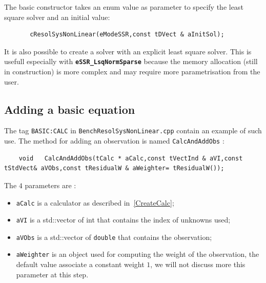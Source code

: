 The basic constructor takes an enum value as parameter to specify
the least square solver and an initial value:

\begin{lstlisting}
       cResolSysNonLinear(eModeSSR,const tDVect & aInitSol);
\end{lstlisting}


It is also possible to create a solver with an explicit least square solver.
This is usefull especially with {\bf \tt eSSR\_LsqNormSparse} because the memory
allocation (still in construction) is more complex and may require more parametrisation
from the user.  \UNCLEAR




\subsection{Adding a basic equation}

\label{AddBasicEq}

The tag  {\tt  BASIC:CALC} in {\tt BenchResolSysNonLinear.cpp} contain an example of such use.
The method for adding an observation is named {\tt CalcAndAddObs} :

\begin{lstlisting}
    void   CalcAndAddObs(tCalc * aCalc,const tVectInd & aVI,const tStdVect& aVObs,const tResidualW & aWeighter= tResidualW());
\end{lstlisting}

The $4$ parameters are :

\begin{itemize}
   \item {\tt aCalc} is a calculator as described in~\ref{CreateCalc};

   \item {\tt aVI} is a std::vector of  int that contains the index of unknowns used;

   \item {\tt aVObs} is a std::vector of  {\tt double} that contains the observation;

   \item {\tt aWeighter} is an object used for computing the weight of the observation, 
         the default value  associate a constant weight $1$, we will not discuss more 
         this parameter at this step.

\end{itemize}

